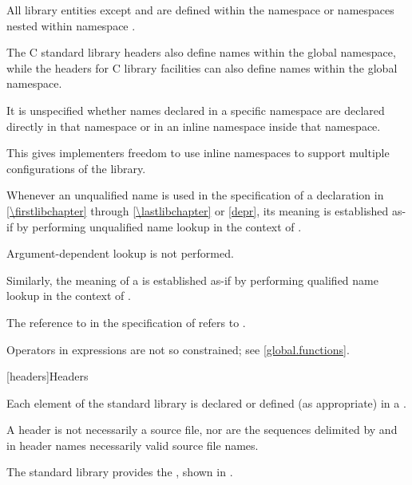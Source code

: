 \pnum
All library entities except
and
are defined within the namespace
or namespaces nested within namespace
.
\begin{footnote}
The C standard library headers also define
names within the global namespace, while the \Cpp{} headers for C library
facilities can also define names within the global namespace.
\end{footnote}
It is unspecified whether names declared in a specific namespace are declared
directly in that namespace or in an inline namespace inside that
namespace.
\begin{footnote}
This gives implementers freedom to use inline namespaces to
support multiple configurations of the library.
\end{footnote}

\pnum
Whenever an unqualified name is used
in the specification of a declaration 
in \ref{\firstlibchapter} through \ref{\lastlibchapter} or \ref{depr},
its meaning is established
as-if by performing unqualified name lookup
in the context of .
\begin{note}
Argument-dependent lookup is not performed.
\end{note}
Similarly, the meaning of a  is established
as-if by performing qualified name lookup
in the context of .
\begin{example}
The reference to  in the specification of  refers to .
\end{example}
\begin{note}
Operators in expressions are not so constrained;
see \ref{global.functions}.
\end{note}

[headers]{Headers}

\pnum
Each element of the \Cpp{} standard library is declared or defined (as appropriate) in a
.
\begin{footnote}
A header is not necessarily a source file, nor are the
sequences delimited by \tcode{<} and \tcode{>} in header names necessarily valid source
file names.
\end{footnote}

\pnum
The \Cpp{} standard library provides the
,
shown in .


